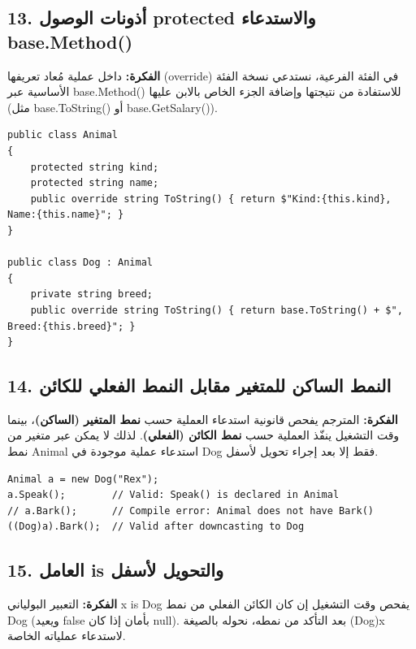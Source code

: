 \documentclass[14pt]{extarticle}
\begin{document}
\filbreak
\subsection*{13. أذونات الوصول \textenglish{protected} والاستدعاء \textenglish{base.Method()}}
\textbf{الفكرة:} داخل عملية مُعاد تعريفها (\textenglish{override}) في الفئة الفرعية، نستدعي نسخة الفئة الأساسية عبر \textenglish{base.Method()} للاستفادة من نتيجتها وإضافة الجزء الخاص بالابن عليها (مثل \textenglish{base.ToString()} أو \textenglish{base.GetSalary()}).

\begin{boxCode}
\begin{english}
\begin{verbatim}
public class Animal
{
    protected string kind;
    protected string name;
    public override string ToString() { return $"Kind:{this.kind}, Name:{this.name}"; }
}

public class Dog : Animal
{
    private string breed;
    public override string ToString() { return base.ToString() + $", Breed:{this.breed}"; }
}
\end{verbatim}
\end{english}
\end{boxCode}

\filbreak
\subsection*{14. النمط الساكن للمتغير مقابل النمط الفعلي للكائن}
\textbf{الفكرة:} المترجم يفحص قانونية استدعاء العملية حسب \textbf{نمط المتغير (الساكن)}، بينما وقت التشغيل ينفّذ العملية حسب \textbf{نمط الكائن (الفعلي)}. لذلك لا يمكن عبر متغير من نمط \textenglish{Animal} استدعاء عملية موجودة في \textenglish{Dog} فقط إلا بعد إجراء تحويل لأسفل.

\begin{boxCode}
\begin{english}
\begin{verbatim}
Animal a = new Dog("Rex");
a.Speak();        // Valid: Speak() is declared in Animal
// a.Bark();      // Compile error: Animal does not have Bark()
((Dog)a).Bark();  // Valid after downcasting to Dog
\end{verbatim}
\end{english}
\end{boxCode}

\filbreak
\subsection*{15. العامل \textenglish{is} والتحويل لأسفل}
\textbf{الفكرة:} التعبير البولياني \textenglish{x is Dog} يفحص وقت التشغيل إن كان الكائن الفعلي من نمط \textenglish{Dog} (ويعيد \textenglish{false} بأمان إذا كان \textenglish{null}). بعد التأكد من نمطه، نحوله بالصيغة \textenglish{(Dog)x} لاستدعاء عملياته الخاصة.
\end{document}

